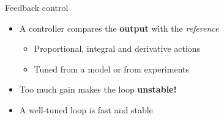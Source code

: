 \begin{frame}{Feedback control}
\begin{itemize}
  \item A controller compares the \textbf{output} with the \textit{reference}
  \begin{itemize}
    \item Proportional, integral and derivative actions
    \item Tuned from a model or from experiments
  \end{itemize}
  \item Too much gain makes the loop \alert{\textbf{unstable!}}
  \item A well-tuned loop is \textcolor[RGB]{0,176,80}{fast and stable}
\end{itemize}
\end{frame}
